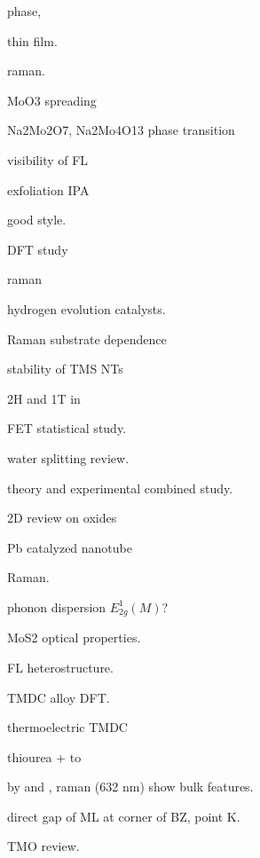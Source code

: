  phase, \cite{Gatehouse1983}

 thin film. \cite{Carcia1987}

 raman.\cite{Hirata1996}

MoO3 spreading \cite{Leyrer1990}

Na2Mo2O7, Na2Mo4O13 phase transition \cite{SinghMudher2005}\cite{Tangri1992}

visibility of FL \cite{Benameur2011}

exfoliation IPA \cite{Halim2013}  \cite{Zhou2011a}

 good style. \cite{Siciliano2009} \cite{Abdellaoui1997}

  DFT study \cite{B511044K} \cite{Cora1997} \cite{Sayede2005}

 raman \cite{Lee2002}



hydrogen evolution catalysts. \cite{Merki2011}

Raman substrate dependence \cite{Buscema2013}

stability of TMS NTs \cite{Seifert2002}

2H and 1T in  \cite{Eda2012}

 FET statistical study. \cite{Liu2013i}

water splitting review. \cite{B800489G}

 theory and experimental combined study. \cite{Klein2001}

2D review on oxides \cite{Osada2012}

Pb catalyzed  nanotube \cite{Brontvein2012}

 Raman.\cite{Zhao2013} \cite{Sekine1980}

phonon dispersion $E_{2g}^1(M)$? \cite{Ataca2012}

MoS2 optical properties.\cite{Search1979}

FL heterostructure. \cite{Yu2013a}

\cite{Kang2013} TMDC alloy DFT.

thermoelectric TMDC \cite{Wickramaratne2014}

 thiourea +  to  \cite{Leonard-Deepak2011}

 by  and , raman (632 nm) show bulk features\cite{Tenne2008}.

direct gap of ML at corner of BZ, point K.

TMO review.\cite{Goodenough2013}

